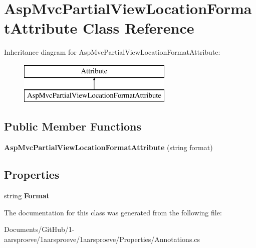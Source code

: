 \hypertarget{class_asp_mvc_partial_view_location_format_attribute}{}\section{Asp\+Mvc\+Partial\+View\+Location\+Format\+Attribute Class Reference}
\label{class_asp_mvc_partial_view_location_format_attribute}
Inheritance diagram for Asp\+Mvc\+Partial\+View\+Location\+Format\+Attribute\+:\begin{figure}[H]
\begin{center}
\leavevmode
\includegraphics[height=2.000000cm]{class_asp_mvc_partial_view_location_format_attribute}
\end{center}
\end{figure}
\subsection*{Public Member Functions}
\begin{DoxyCompactItemize}
\item 
\hypertarget{class_asp_mvc_partial_view_location_format_attribute_a890db06863b6c2b93fbdb6435b512411}{}{\bfseries Asp\+Mvc\+Partial\+View\+Location\+Format\+Attribute} (string format)\label{class_asp_mvc_partial_view_location_format_attribute_a890db06863b6c2b93fbdb6435b512411}

\end{DoxyCompactItemize}
\subsection*{Properties}
\begin{DoxyCompactItemize}
\item 
\hypertarget{class_asp_mvc_partial_view_location_format_attribute_ab75cab80e0a441e206eadb7adce25efd}{}string {\bfseries Format}\label{class_asp_mvc_partial_view_location_format_attribute_ab75cab80e0a441e206eadb7adce25efd}

\end{DoxyCompactItemize}


The documentation for this class was generated from the following file\+:\begin{DoxyCompactItemize}
\item 
Documents/\+Git\+Hub/1-\/aarsproeve/1aarsproeve/1aarsproeve/\+Properties/Annotations.\+cs\end{DoxyCompactItemize}
